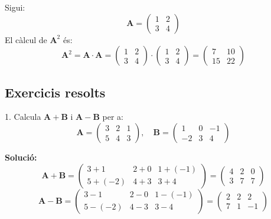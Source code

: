 \documentclass[12pt]{article}
\newcommand{\mat}[1]{\mathbf{#1}}
\begin{document}
\begin{exemple}
Sigui:
\[
\mat{A} = \begin{pmatrix}
1 & 2 \\
3 & 4
\end{pmatrix}
\]
El càlcul de $\mat{A}^2$ és:
\[
\mat{A}^2 = \mat{A} \cdot \mat{A} = \begin{pmatrix}
1 & 2 \\
3 & 4
\end{pmatrix} \cdot \begin{pmatrix}
1 & 2 \\
3 & 4
\end{pmatrix} =
\begin{pmatrix}
7 & 10 \\
15 & 22
\end{pmatrix}
\]
\end{exemple}

\subsection*{Exercicis resolts}
\begin{exercici}
1. Calcula $\mat{A} + \mat{B}$ i $\mat{A} - \mat{B}$ per a:
\[
\mat{A} = \begin{pmatrix}
3 & 2 & 1 \\
5 & 4 & 3
\end{pmatrix}, \quad
\mat{B} = \begin{pmatrix}
1 & 0 & -1 \\
-2 & 3 & 4
\end{pmatrix}
\]

\textbf{Solució:}
\[
\mat{A} + \mat{B} = \begin{pmatrix}
3+1 & 2+0 & 1+(-1) \\
5+(-2) & 4+3 & 3+4
\end{pmatrix} =
\begin{pmatrix}
4 & 2 & 0 \\
3 & 7 & 7
\end{pmatrix}
\]
\[
\mat{A} - \mat{B} = \begin{pmatrix}
3-1 & 2-0 & 1-(-1) \\
5-(-2) & 4-3 & 3-4
\end{pmatrix} =
\begin{pmatrix}
2 & 2 & 2 \\
7 & 1 & -1
\end{pmatrix}
\]
\end{exercici}
\end{document}
